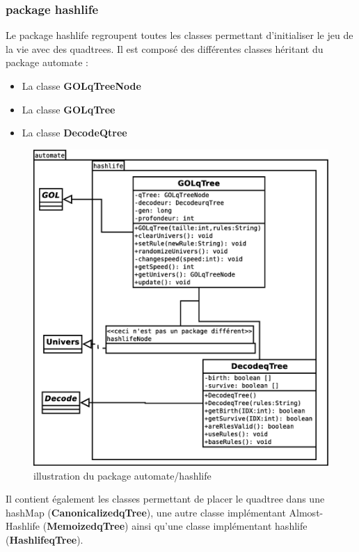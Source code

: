\subsubsection{package hashlife}
Le package hashlife regroupent toutes les classes permettant d'initialiser le jeu de la vie avec des quadtrees. Il est composé des différentes classes héritant du package automate :\begin{itemize}
    \item La classe \textbf{GOLqTreeNode}
    \item La classe \textbf{GOLqTree}
    \item La classe \textbf{DecodeQtree}
\end{itemize}
\begin{figure}[htp]
\centering
\includegraphics[scale=0.35]{images/Diagramme/package_automate_hashlife.eps}
\caption{\label{fig:Automate/hashlife}illustration du package automate/hashlife}
\end{figure}
\par Il contient également les classes permettant de placer le quadtree dans une hashMap (\textbf{CanonicalizedqTree}), une autre classe implémentant Almost-Hashlife (\textbf{MemoizedqTree}) ainsi qu'une classe implémentant hashlife (\textbf{HashlifeqTree}).
